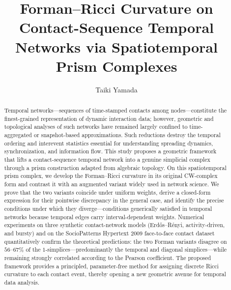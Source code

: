 \documentclass[
    pre,
    twocolumn,
    superscriptaddress,
    showpacs,
    nofootinbib,
    amsmath,
    amssymb,
    floatfix
]{revtex4-2}
\theoremstyle{plain} %
\theoremstyle{definition} %
\begin{document}
\title{Forman--Ricci Curvature on Contact-Sequence Temporal Networks
       via Spatiotemporal Prism Complexes}

\author{Taiki Yamada}



\begin{abstract}
Temporal networks---sequences of time-stamped contacts among nodes---constitute the finest-grained representation of dynamic interaction data; however, geometric and topological analyses of such networks have remained largely confined to time-aggregated or snapshot-based approximations. 
Such reductions destroy the temporal ordering and interevent statistics essential for understanding spreading dynamics, synchronization, and information flow.  
This study proposes a geometric framework that lifts a contact-sequence temporal network into a genuine simplicial complex through a prism construction adapted from algebraic topology.  On this spatiotemporal prism complex, we develop the Forman--Ricci curvature in its original CW-complex form and contrast it with an augmented variant widely used in network science. 
We prove that the two variants coincide under uniform weights, derive a closed-form expression for their pointwise discrepancy in the general case, and identify the precise conditions under which they diverge---conditions generically satisfied in temporal networks because temporal edges carry interval-dependent weights.
Numerical experiments on three synthetic contact-network models (Erd\H os--R\'enyi, activity-driven, and bursty) and on the SocioPatterns Hypertext 2009 face-to-face contact dataset quantitatively confirm the theoretical predictions: the two Forman variants disagree on $56$--$67\%$ of the $1$-simplices---predominantly the temporal and diagonal simplices---while remaining strongly correlated according to the Pearson coefficient.
The proposed framework provides a principled, parameter-free method for assigning discrete Ricci curvature to each contact event, thereby opening a new geometric avenue for temporal data analysis.
\end{abstract}

\maketitle
\end{document}
